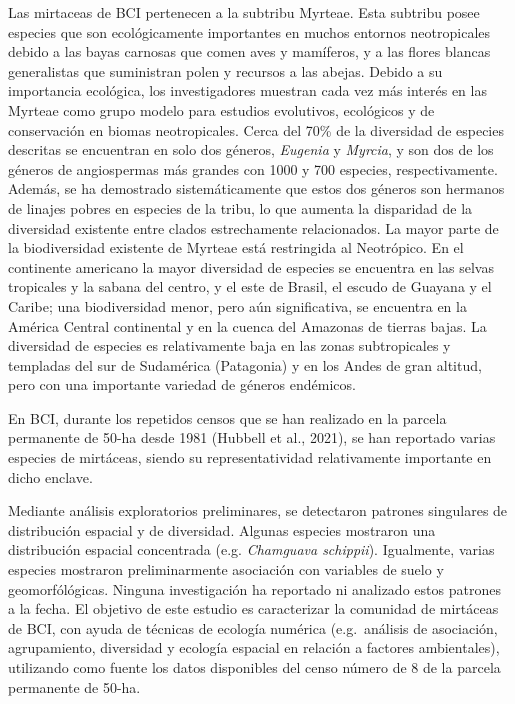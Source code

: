 \documentclass[11pt,]{article}
\begin{document}
Las mirtaceas de BCI pertenecen a la subtribu Myrteae. Esta subtribu
posee especies que son ecológicamente importantes en muchos entornos
neotropicales debido a las bayas carnosas que comen aves y mamíferos, y
a las flores blancas generalistas que suministran polen y recursos a las
abejas. Debido a su importancia ecológica, los investigadores muestran
cada vez más interés en las Myrteae como grupo modelo para estudios
evolutivos, ecológicos y de conservación en biomas neotropicales. Cerca
del 70\% de la diversidad de especies descritas se encuentran en solo
dos géneros, \emph{Eugenia} y \emph{Myrcia}, y son dos de los géneros de
angiospermas más grandes con 1000 y 700 especies, respectivamente.
Además, se ha demostrado sistemáticamente que estos dos géneros son
hermanos de linajes pobres en especies de la tribu, lo que aumenta la
disparidad de la diversidad existente entre clados estrechamente
relacionados. La mayor parte de la biodiversidad existente de Myrteae
está restringida al Neotrópico. En el continente americano la mayor
diversidad de especies se encuentra en las selvas tropicales y la sabana
del centro, y el este de Brasil, el escudo de Guayana y el Caribe; una
biodiversidad menor, pero aún significativa, se encuentra en la América
Central continental y en la cuenca del Amazonas de tierras bajas. La
diversidad de especies es relativamente baja en las zonas subtropicales
y templadas del sur de Sudamérica (Patagonia) y en los Andes de gran
altitud, pero con una importante variedad de géneros endémicos.

En BCI, durante los repetidos censos que se han realizado en la parcela
permanente de 50-ha desde 1981 (Hubbell et al., 2021), se han reportado
varias especies de mirtáceas, siendo su representatividad relativamente
importante en dicho enclave.

Mediante análisis exploratorios preliminares, se detectaron patrones
singulares de distribución espacial y de diversidad. Algunas especies
mostraron una distribución espacial concentrada (e.g. \emph{Chamguava
schippii}). Igualmente, varias especies mostraron preliminarmente
asociación con variables de suelo y geomorfólógicas. Ninguna
investigación ha reportado ni analizado estos patrones a la fecha. El
objetivo de este estudio es caracterizar la comunidad de mirtáceas de
BCI, con ayuda de técnicas de ecología numérica (e.g.~análisis de
asociación, agrupamiento, diversidad y ecología espacial en relación a
factores ambientales), utilizando como fuente los datos disponibles del
censo número de 8 de la parcela permanente de 50-ha.
\end{document}
